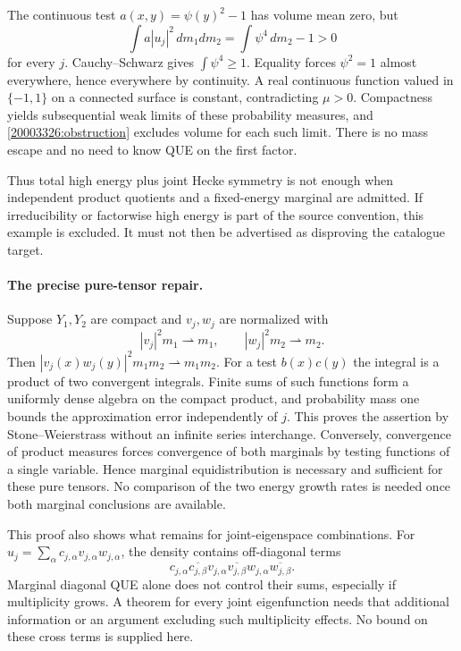 \documentclass[11pt,a4paper]{article}
\numberwithin{equation}{section}
\begin{document}
The continuous test $a(x,y)=\psi(y)^2-1$ has volume mean zero, but
\begin{equation}\label{20003326:obstruction}
 \int a|u_j|^2\,dm_1dm_2=\int\psi^4\,dm_2-1>0
\end{equation}
for every $j$. Cauchy--Schwarz gives $\int\psi^4\ge1$. Equality forces
$\psi^2=1$ almost everywhere, hence everywhere by continuity. A real
continuous function valued in $\{-1,1\}$ on a connected surface is constant,
contradicting $\mu>0$. Compactness yields subsequential weak limits of these
probability measures, and \eqref{20003326:obstruction} excludes volume for each
such limit. There is no mass escape and no need to know QUE on the first
factor.

Thus total high energy plus joint Hecke symmetry is not enough when
independent product quotients and a fixed-energy marginal are admitted.
If irreducibility or factorwise high energy is part of the source convention,
this example is excluded. It must not then be advertised as disproving the
catalogue target.

\paragraph{The precise pure-tensor repair.}
Suppose $Y_1,Y_2$ are compact and $v_j,w_j$ are normalized with
\[
 |v_j|^2m_1\rightharpoonup m_1,\qquad
 |w_j|^2m_2\rightharpoonup m_2.
\]
Then $|v_j(x)w_j(y)|^2m_1m_2\rightharpoonup m_1m_2$. For a test
$b(x)c(y)$ the integral is a product of two convergent integrals. Finite sums
of such functions form a uniformly dense algebra on the compact product,
and probability mass one bounds the approximation error independently of
$j$. This proves the assertion by Stone--Weierstrass without an infinite
series interchange. Conversely, convergence of product measures forces
convergence of both marginals by testing functions of a single variable.
Hence marginal equidistribution is necessary and sufficient for these
pure tensors. No comparison of the two energy growth rates is needed once
both marginal conclusions are available.

This proof also shows what remains for joint-eigenspace combinations.
For $u_j=\sum_\alpha c_{j,\alpha}v_{j,\alpha}w_{j,\alpha}$, the density
contains off-diagonal terms
\[
 c_{j,\alpha}\overline{c_{j,\beta}}
 v_{j,\alpha}\overline{v_{j,\beta}}
 w_{j,\alpha}\overline{w_{j,\beta}}.
\]
Marginal diagonal QUE alone does not control their sums, especially if
multiplicity grows. A theorem for every joint eigenfunction needs that
additional information or an argument excluding such multiplicity effects.
No bound on these cross terms is supplied here.
\end{document}
